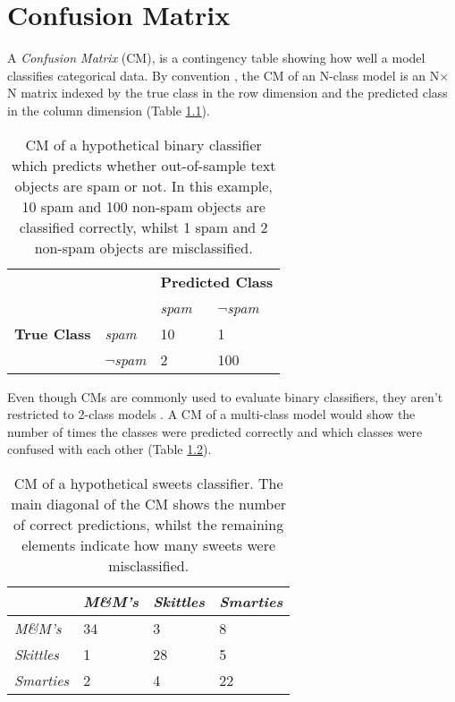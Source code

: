 \chapter{Confusion Matrix}
\label{ch:confusion-matrix}

A \textit{Confusion Matrix} (CM), is a contingency table showing how well a model classifies categorical data. By convention \citep{sammut2017encyclopedia}, the CM of an N-class model is an N$\times$N matrix indexed by the true class in the row dimension and the predicted class in the column dimension (Table \ref{tab:cm_spam}).


\begin{table}[ht]
  \centering
  \selectfont
  \begin{tabular}{llll}
    \toprule
                        &                     & \multicolumn{2}{c}{\textbf{Predicted Class}} \\
                        &                     & \textit{spam} & \textit{$\neg$spam} \\
    \midrule
    \textbf{True Class} & \textit{spam}       & 10           & 1 \\
                        & \textit{$\neg$spam} & 2            & 100 \\
    \bottomrule
  \end{tabular}
  \caption{CM of a hypothetical binary classifier which predicts whether out-of-sample text objects are spam or not. In this example, 10 spam and 100 non-spam objects are classified correctly, whilst 1 spam and 2 non-spam objects are misclassified.}
  \label{tab:cm_spam}
\end{table}

Even though CMs are commonly used to evaluate binary classifiers, they aren't restricted to 2-class models \citep{martin2018speech}. A CM of a multi-class model would show the number of times the classes were predicted correctly and which classes were confused with each other (Table \ref{tab:cm_sweets}).

\begin{table}[ht]
  \centering
  \selectfont
  \begin{tabular}{llll}
    \toprule
                      & \textit{M\&M's} & \textit{Skittles} & \textit{Smarties} \\
    \midrule
    \textit{M\&M's}   & 34              & 3                 & 8  \\
    \textit{Skittles} & 1               & 28                & 5  \\
    \textit{Smarties} & 2               & 4                 & 22 \\
    \bottomrule
  \end{tabular}
  \caption{CM of a hypothetical sweets classifier. The main diagonal of the CM shows the number of correct predictions, whilst the remaining elements indicate how many sweets were misclassified.}
  \label{tab:cm_sweets}
\end{table}


